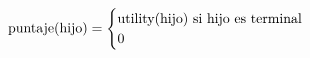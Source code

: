 \documentclass[preview]{standalone}
\begin{document}
\begin{align*}
\text{puntaje(hijo)} =  \begin{cases} \text{utility(hijo) si hijo es terminal} \cr 0 \cr \end{cases}
\end{align*}
\end{document}
